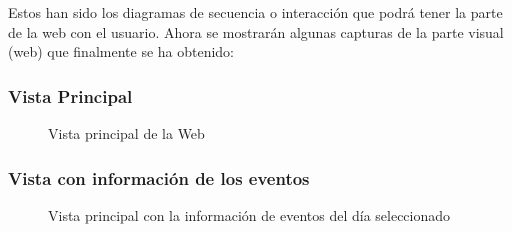 Estos han sido los diagramas de secuencia o interacción que podrá tener la parte de la web con el usuario. Ahora se mostrarán algunas capturas de la parte visual (web) que finalmente se ha obtenido:

\subsubsection{Vista Principal}

\begin{figure}[H]
\caption{Vista principal de la Web}
\end{figure}

\subsubsection{Vista con información de los eventos}

\begin{figure}[H]
\caption{Vista principal con la información de eventos del día seleccionado}
\end{figure}

